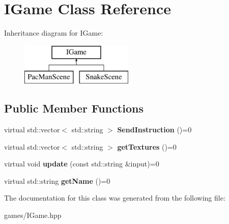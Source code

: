 \hypertarget{class_i_game}{}\section{I\+Game Class Reference}
\label{class_i_game}
Inheritance diagram for I\+Game\+:\begin{figure}[H]
\begin{center}
\leavevmode
\includegraphics[height=2.000000cm]{class_i_game}
\end{center}
\end{figure}
\subsection*{Public Member Functions}
\begin{DoxyCompactItemize}
\item 
\mbox{\label{class_i_game_a143a6acaa498c08964089c293fbaecba}} 
virtual std\+::vector$<$ std\+::string $>$ {\bfseries Send\+Instruction} ()=0
\item 
\mbox{\label{class_i_game_a46b64ca02a645790bbd83d9c7aa28cec}} 
virtual std\+::vector$<$ std\+::string $>$ {\bfseries get\+Textures} ()=0
\item 
\mbox{\label{class_i_game_aa3488c71c14dac53703e8debab91b503}} 
virtual void {\bfseries update} (const std\+::string \&input)=0
\item 
\mbox{\label{class_i_game_a43bfc6eee8384673e768016b7082c264}} 
virtual std\+::string {\bfseries get\+Name} ()=0
\end{DoxyCompactItemize}


The documentation for this class was generated from the following file\+:\begin{DoxyCompactItemize}
\item 
games/I\+Game.\+hpp\end{DoxyCompactItemize}
